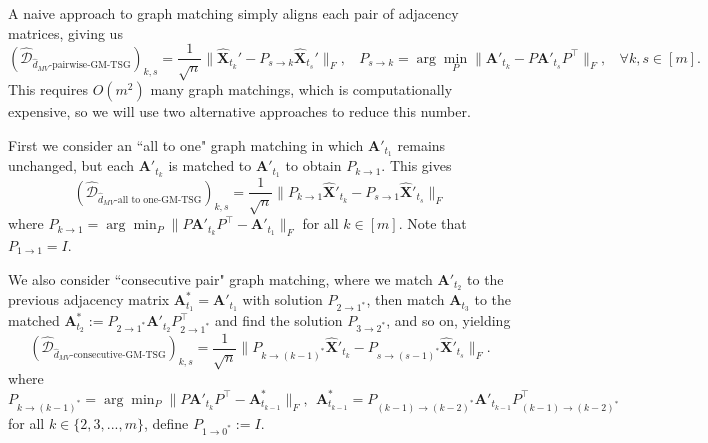 \documentclass[12pt]{article}
\theoremstyle{definition}
\newcommand{\bA}{\mathbf{A}}
\newcommand{\bX}{\mathbf{X}}
\begin{document}
A naive approach to graph matching simply aligns each pair of adjacency matrices, giving us
$$
\left(\hat{\mathcal{D}}_{\hat{d}_{MV}\text{-pairwise-GM-TSG}}\right)_{k,s} 
= 
\frac{1}{\sqrt{n}} \| \hat{\bX}_{t_k}' - P_{s \to k}\hat{\bX}_{t_s}'\|_F,~~~~ P_{s \to k} = \arg \min_{P} \| \bA'_{t_k} - P \bA'_{t_s} P^{\top} \|_F, ~~~~ \forall k,s \in [m].
$$ 
This requires $O(m^2)$ many graph matchings, which is computationally expensive, so we will use two alternative approaches to reduce this number. 

First we consider an ``all to one" graph matching in which $\bA'_{t_1}$ remains unchanged, but each $\bA'_{t_k}$ is matched to $\bA'_{t_1}$ to obtain $P_{k\to1}$. This gives
\begin{equation}\label{eq:alltoonegm}
\left(\hat{\mathcal{D}}_{\hat{d}_{MV}\text{-all to one-GM-TSG}}\right)_{k,s} 
=  \frac{1}{\sqrt{n}} \| P_{k\to1} \hat{\bX}'_{t_k} - P_{s\to1}\hat{\bX}'_{t_s}\|_F
\end{equation}
where $P_{k\to1} = \arg \min_{P} \| P \bA'_{t_k} P^{\top} -  \bA'_{t_1}\|_F $ for all $k \in [m]$. Note that $P_{1 \to 1} = I$. 

We also consider ``consecutive pair" graph matching, where we match $\bA'_{t_2}$ to the previous adjacency matrix $\bA^{\ast}_{t_1} = \bA'_{t_1}$ with solution $P_{2\to1^{\ast}}$, then match $\bA_{t_3}$ to the matched $\bA^{\ast}_{t_2} := P_{2\to1^{\ast}} \bA'_{t_2} P^{\top}_{2\to1^{\ast}}$ and find the solution $P_{3 \to 2^{\ast}}$, and so on, yielding
$$
\left(\hat{\mathcal{D}}_{\hat{d}_{MV}\text{-consecutive-GM-TSG}}\right)_{k,s}
=  \frac{1}{\sqrt{n}} \| P_{k\to (k-1)^{\ast}} \hat{\bX}'_{t_k} - P_{s\to(s-1)^{\ast}}\hat{\bX}'_{t_s} \|_F.
$$
where $P_{k\to(k-1)^{\ast}} = \arg \min_{P} \| P \bA'_{t_k} P^{\top} -  \bA^{\ast}_{t_{k-1}} \|_F, ~~ \bA^{\ast}_{t_{k-1}} = P_{(k-1) \to (k-2)^{\ast}}\bA'_{t_{k-1}}P^{\top}_{(k-1) \to (k-2)^{\ast}} $ for all $k \in \{2,3,...,m\}$, define $P_{1 \to 0^\ast} := I$. 
\end{document}
